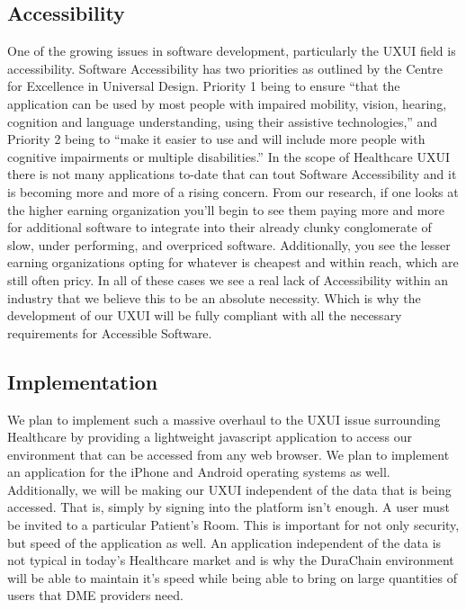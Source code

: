 \documentclass[preprint,pre,floats,aps,amsmath,amssymb]{revtex4-1}
\begin{document}
\subsection{Accessibility}
One of the growing issues in software development, particularly the UXUI field is accessibility. Software Accessibility has two priorities as outlined by the Centre for Excellence in Universal Design. Priority 1 being to ensure “that the application can be used by most people with impaired mobility, vision, hearing, cognition and language understanding, using their assistive technologies,” and Priority 2 being to “make it easier to use and will include more people with cognitive impairments or multiple disabilities.” In the scope of Healthcare UXUI there is not many applications to-date that can tout Software Accessibility and it is becoming more and more of a rising concern. From our research, if one looks at the higher earning organization you’ll begin to see them paying more and more for additional software to integrate into their already clunky conglomerate of slow, under performing, and overpriced software. Additionally, you see the lesser earning organizations opting for whatever is cheapest and within reach, which are still often pricy. In all of these cases we see a real lack of Accessibility within an industry that we believe this to be an absolute necessity. Which is why the development of our UXUI will be fully compliant with all the necessary requirements for Accessible Software.

\subsection{Implementation}
We plan to implement such a massive overhaul to the UXUI issue surrounding Healthcare by providing a lightweight javascript application to access our environment that can be accessed from any web browser. We plan to implement an application for the iPhone and Android operating systems as well. Additionally, we will be making our UXUI independent of the data that is being accessed. That is, simply by signing into the platform isn’t enough. A user must be invited to a particular Patient’s Room. This is important for not only security, but speed of the application as well. An application independent of the data is not typical in today’s Healthcare market and is why the DuraChain environment will be able to maintain it’s speed while being able to bring on large quantities of users that DME providers need.
\end{document}
